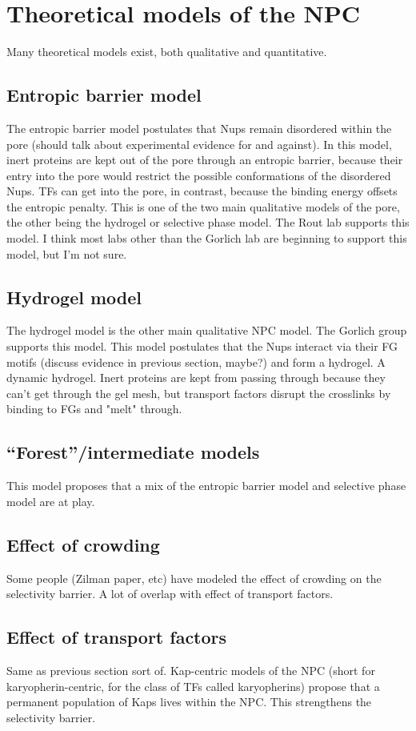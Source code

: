 \section{Theoretical models of the NPC}
Many theoretical models exist, both qualitative and quantitative.
\subsection{Entropic barrier model}
The entropic barrier model postulates that Nups remain disordered within the pore (should talk about experimental evidence for and against).  In this model, inert proteins are kept out of the pore through an entropic barrier, because their entry into the pore would restrict the possible conformations of the disordered Nups.  TFs can get into the pore, in contrast, because the binding energy offsets the entropic penalty.  This is one of the two main qualitative models of the pore, the other being the hydrogel or selective phase model.  The Rout lab supports this model.  I think most labs other than the Gorlich lab are beginning to support this model, but I'm not sure.
\subsection{Hydrogel model}
The hydrogel model is the other main qualitative NPC model.  The Gorlich group supports this model.  This model postulates that the Nups interact via their FG motifs (discuss evidence in previous section, maybe?) and form a hydrogel.  A dynamic hydrogel.  Inert proteins are kept from passing through because they can't get through the gel mesh, but transport factors disrupt the crosslinks by binding to FGs and "melt" through.
\subsection{“Forest”/intermediate models}
This model proposes that a mix of the entropic barrier model and selective phase model are at play.
\subsection{Effect of crowding}
Some people (Zilman paper, etc) have modeled the effect of crowding on the selectivity barrier.  A lot of overlap with effect of transport factors.
\subsection{Effect of transport factors}
Same as previous section sort of.  Kap-centric models of the NPC (short for karyopherin-centric, for the class of TFs called karyopherins) propose that a permanent population of Kaps lives within the NPC.  This strengthens the selectivity barrier.
